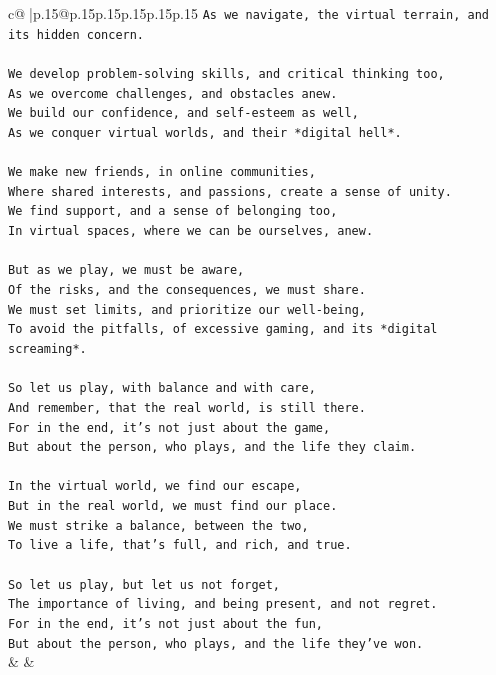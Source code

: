 \documentclass{article}
\begin{document}
{\begin{supertabular}{c@{$\;$}|p{.15\linewidth}@{}p{.15\linewidth}p{.15\linewidth}p{.15\linewidth}p{.15\linewidth}p{.15\linewidth}}
{{{\texttt{As we navigate, the virtual terrain, and its hidden concern.} \\
\\ 
\texttt{We develop problem{-}solving skills, and critical thinking too,} \\
\texttt{As we overcome challenges, and obstacles anew.} \\
\texttt{We build our confidence, and self{-}esteem as well,} \\
\texttt{As we conquer virtual worlds, and their *digital hell*.} \\
\\ 
\texttt{We make new friends, in online communities,} \\
\texttt{Where shared interests, and passions, create a sense of unity.} \\
\texttt{We find support, and a sense of belonging too,} \\
\texttt{In virtual spaces, where we can be ourselves, anew.} \\
\\ 
\texttt{But as we play, we must be aware,} \\
\texttt{Of the risks, and the consequences, we must share.} \\
\texttt{We must set limits, and prioritize our well{-}being,} \\
\texttt{To avoid the pitfalls, of excessive gaming, and its *digital screaming*.} \\
\\ 
\texttt{So let us play, with balance and with care,} \\
\texttt{And remember, that the real world, is still there.} \\
\texttt{For in the end, it's not just about the game,} \\
\texttt{But about the person, who plays, and the life they claim.} \\
\\ 
\texttt{In the virtual world, we find our escape,} \\
\texttt{But in the real world, we must find our place.} \\
\texttt{We must strike a balance, between the two,} \\
\texttt{To live a life, that's full, and rich, and true.} \\
\\ 
\texttt{So let us play, but let us not forget,} \\
\texttt{The importance of living, and being present, and not regret.} \\
\texttt{For in the end, it's not just about the fun,} \\
\texttt{But about the person, who plays, and the life they've won.} \\
            }
        }
    }
    & & \\ \\


\end{supertabular}}
\end{document}
